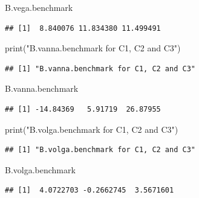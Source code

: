 \documentclass[
]{article}
\newenvironment{Shaded}{\begin{snugshade}}{\end{snugshade}}
\newcommand{\FunctionTok}[1]{\textcolor[rgb]{0.00,0.00,0.00}{#1}}
\newcommand{\NormalTok}[1]{#1}
\newcommand{\StringTok}[1]{\textcolor[rgb]{0.31,0.60,0.02}{#1}}
\begin{document}
\begin{Shaded}
\begin{Highlighting}[]
\NormalTok{B.vega.benchmark}
\end{Highlighting}
\end{Shaded}

\begin{verbatim}
## [1]  8.840076 11.834380 11.499491
\end{verbatim}

\begin{Shaded}
\begin{Highlighting}[]
\FunctionTok{print}\NormalTok{(}\StringTok{"B.vanna.benchmark for C1, C2 and C3"}\NormalTok{)}
\end{Highlighting}
\end{Shaded}

\begin{verbatim}
## [1] "B.vanna.benchmark for C1, C2 and C3"
\end{verbatim}

\begin{Shaded}
\begin{Highlighting}[]
\NormalTok{B.vanna.benchmark}
\end{Highlighting}
\end{Shaded}

\begin{verbatim}
## [1] -14.84369   5.91719  26.87955
\end{verbatim}

\begin{Shaded}
\begin{Highlighting}[]
\FunctionTok{print}\NormalTok{(}\StringTok{"B.volga.benchmark for C1, C2 and C3"}\NormalTok{)}
\end{Highlighting}
\end{Shaded}

\begin{verbatim}
## [1] "B.volga.benchmark for C1, C2 and C3"
\end{verbatim}

\begin{Shaded}
\begin{Highlighting}[]
\NormalTok{B.volga.benchmark}
\end{Highlighting}
\end{Shaded}

\begin{verbatim}
## [1]  4.0722703 -0.2662745  3.5671601
\end{verbatim}
\end{document}
